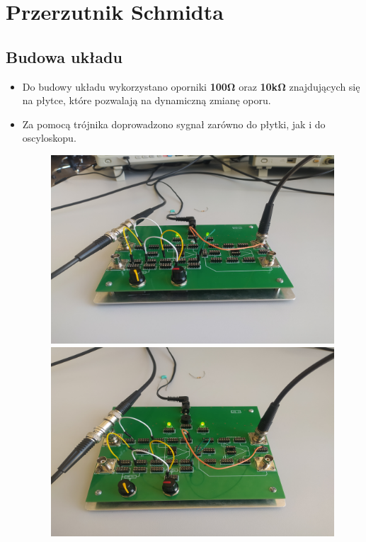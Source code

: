 \chapter{Przerzutnik Schmidta}

\section{Budowa układu}

\begin{itemize}
    \item Do budowy układu wykorzystano oporniki \textbf{100}$\boldsymbol{\Omega}$ oraz \textbf{10k}$\boldsymbol{\Omega}$ znajdujących się na płytce, które pozwalają na dynamiczną zmianę oporu.
    \item Za pomocą trójnika doprowadzono sygnał zarówno do płytki, jak i do oscyloskopu.
        \begin{figure}[H]
            \centering
            \includegraphics[scale=0.17]{img/phone/1651502036786_scaled.png}
            \includegraphics[scale=0.17]{img/phone/1651502036800_scaled.png}

\end{figure}
\end{itemize}
